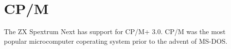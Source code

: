\section{CP/M}
The ZX Spextrum Next has support for CP/M+ 3.0. CP/M was the most
popular microcomputer coperating system prior to the advent of MS-DOS.




